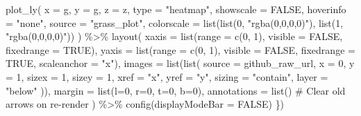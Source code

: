 \documentclass[
]{article}
\newenvironment{Shaded}{\begin{snugshade}}{\end{snugshade}}
\newcommand{\AttributeTok}[1]{\textcolor[rgb]{0.40,0.45,0.13}{#1}}
\newcommand{\CommentTok}[1]{\textcolor[rgb]{0.37,0.37,0.37}{#1}}
\newcommand{\ConstantTok}[1]{\textcolor[rgb]{0.56,0.35,0.01}{#1}}
\newcommand{\DecValTok}[1]{\textcolor[rgb]{0.68,0.00,0.00}{#1}}
\newcommand{\ErrorTok}[1]{\textcolor[rgb]{0.68,0.00,0.00}{#1}}
\newcommand{\FunctionTok}[1]{\textcolor[rgb]{0.28,0.35,0.67}{#1}}
\newcommand{\NormalTok}[1]{\textcolor[rgb]{0.00,0.23,0.31}{#1}}
\newcommand{\SpecialCharTok}[1]{\textcolor[rgb]{0.37,0.37,0.37}{#1}}
\newcommand{\StringTok}[1]{\textcolor[rgb]{0.13,0.47,0.30}{#1}}
\newcounter{none} %
\begin{document}
\begin{Shaded}
\begin{Highlighting}[]
\FunctionTok{plot\_ly}\NormalTok{(}
      \AttributeTok{x =}\NormalTok{ g, }\AttributeTok{y =}\NormalTok{ g, }\AttributeTok{z =}\NormalTok{ z,}
      \AttributeTok{type =} \StringTok{"heatmap"}\NormalTok{,}
      \AttributeTok{showscale =} \ConstantTok{FALSE}\NormalTok{,}
      \AttributeTok{hoverinfo =} \StringTok{"none"}\NormalTok{,}
      \AttributeTok{source =} \StringTok{"grass\_plot"}\NormalTok{,}
      \AttributeTok{colorscale =} \FunctionTok{list}\NormalTok{(}\FunctionTok{list}\NormalTok{(}\DecValTok{0}\NormalTok{, }\StringTok{"rgba(0,0,0,0)"}\NormalTok{), }
      \FunctionTok{list}\NormalTok{(}\DecValTok{1}\NormalTok{, }\StringTok{"rgba(0,0,0,0)"}\NormalTok{))}
\NormalTok{    ) }\SpecialCharTok{\%\textgreater{}\%}
      \FunctionTok{layout}\NormalTok{(}
        \AttributeTok{xaxis =} \FunctionTok{list}\NormalTok{(}\AttributeTok{range =} \FunctionTok{c}\NormalTok{(}\DecValTok{0}\NormalTok{, }\DecValTok{1}\NormalTok{), }\AttributeTok{visible =} \ConstantTok{FALSE}\NormalTok{, }
        \AttributeTok{fixedrange =} \ConstantTok{TRUE}\NormalTok{),}
        \AttributeTok{yaxis =} \FunctionTok{list}\NormalTok{(}\AttributeTok{range =} \FunctionTok{c}\NormalTok{(}\DecValTok{0}\NormalTok{, }\DecValTok{1}\NormalTok{), }\AttributeTok{visible =} \ConstantTok{FALSE}\NormalTok{, }
        \AttributeTok{fixedrange =} \ConstantTok{TRUE}\NormalTok{, }\AttributeTok{scaleanchor =} \StringTok{"x"}\NormalTok{),}
        \AttributeTok{images =} \FunctionTok{list}\NormalTok{(}\FunctionTok{list}\NormalTok{(}
          \AttributeTok{source =}\NormalTok{ github\_raw\_url,}
          \AttributeTok{x =} \DecValTok{0}\NormalTok{, }\AttributeTok{y =} \DecValTok{1}\NormalTok{, }\AttributeTok{sizex =} \DecValTok{1}\NormalTok{, }\AttributeTok{sizey =} \DecValTok{1}\NormalTok{,}
          \AttributeTok{xref =} \StringTok{"x"}\NormalTok{, }\AttributeTok{yref =} \StringTok{"y"}\NormalTok{, }\AttributeTok{sizing =} \StringTok{"contain"}\NormalTok{, }
          \AttributeTok{layer =} \StringTok{"below"}
\NormalTok{        )),}
        \AttributeTok{margin =} \FunctionTok{list}\NormalTok{(}\AttributeTok{l=}\DecValTok{0}\NormalTok{, }\AttributeTok{r=}\DecValTok{0}\NormalTok{, }\AttributeTok{t=}\DecValTok{0}\NormalTok{, }\AttributeTok{b=}\DecValTok{0}\NormalTok{),}
        \AttributeTok{annotations =} \FunctionTok{list}\NormalTok{() }\CommentTok{\# Clear old arrows on re{-}render}
\NormalTok{      ) }\SpecialCharTok{\%\textgreater{}\%}
      \FunctionTok{config}\NormalTok{(}\AttributeTok{displayModeBar =} \ConstantTok{FALSE}\NormalTok{)}
  \ErrorTok{\})}
\end{Highlighting}
\end{Shaded}
\end{document}
